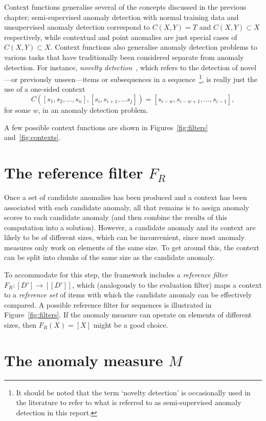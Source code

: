 Context functions generalise several of the concepts discussed in the previous chapter; semi-supervised anomaly detection with normal training data and unsupervised anomaly detection correspond to $C(X, Y) = T$ and $C(X, Y) \subset X$ respectively, while contextual and point anomalies are just special cases of $C(X, Y) \subset X$. Context functions also generalise anomaly detection problems to various tasks that have traditionally been considered separate from anomaly detection. For instance, \emph{novelty detection}~\cite{chandola}, which refers to the detection of novel---or previously unseen---items or subsequences in a sequence~\footnote{It should be noted that the term `novelty detection' is occasionally used in the literature to refer to what is referred to as semi-supervised anomaly detection in this report.}, is really just the use of a one-sided context
\[
    C([s_1, s_2, \dots, s_n], [s_i, s_{i+1}, \dots s_j]) = [s_{i-w}, s_{i - w + 1}, \dots, s_{i - 1}],
\]
for some $w$, in an anomaly detection problem.

A few possible context functions are shown in Figures~\ref{fig:filters} and~\ref{fig:contexts}.

\section{The reference filter $F_R$}

Once a set of candidate anomalies has been produced and a context has been associated with each candidate anomaly, all that remains is to assign anomaly scores to each candidate anomaly (and then combine the results of this computation into a solution). However, a candidate anomaly and its context are likely to be of different sizes, which can be inconvenient, since most anomaly measures only work on elements of the same size. To get around this, the context can be split into chunks of the same size as the candidate anomaly.

To accommodate for this step, the framework includes a \emph{reference filter} $F_R: [D'] \rightarrow [[D']] $, which (analogously to the evaluation filter) maps a context to a \emph{reference set} of items with which the candidate anomaly can be effectively compared. A possible reference filter for sequences is illustrated in Figure~\ref{fig:filters}. If the anomaly measure can operate on elements of different sizes, then $F_R(X) = [X]$ might be a good choice.

\section{The anomaly measure $M$}

